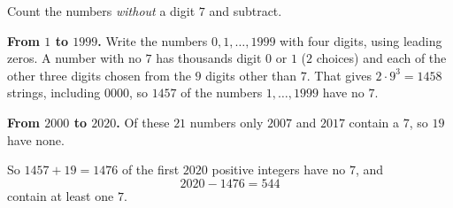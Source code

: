 Count the numbers \emph{without} a digit $7$ and subtract.

\textbf{From $1$ to $1999$.} Write the numbers $0,1,\dots,1999$ with four digits, using leading zeros. A number with no $7$ has thousands digit $0$ or $1$ ($2$ choices) and each of the other three digits chosen from the $9$ digits other than $7$. That gives $2\cdot9^3=1458$ strings, including $0000$, so $1457$ of the numbers $1,\dots,1999$ have no $7$.

\textbf{From $2000$ to $2020$.} Of these $21$ numbers only $2007$ and $2017$ contain a $7$, so $19$ have none.

So $1457+19=1476$ of the first $2020$ positive integers have no $7$, and
\[2020-1476=\boxed{544}\]
contain at least one $7$.
